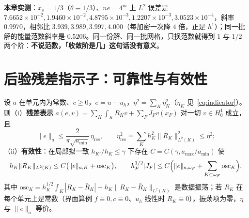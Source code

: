 \textbf{本章实测}：$x_s=1/3$（$\theta\equiv1/3$）、$ne=4^m$ 上 $L^2$ 误差是
$7.6652\times10^{-2},1.9460\times10^{-2},4.8795\times10^{-3},1.2207\times10^{-3},3.0523\times10^{-4}$，斜率
$0.9970$，相邻比 $3.939,3.989,3.997,4.000$（每加密一次降 $4$ 倍，正是 $h^1$）；同一批解的能量范数斜率是
$0.5206$。同一份解、同一批网格，只换范数就得到 $1$ 与 $1/2$ 两个阶：\textbf{不说范数，「收敛阶是几」这句话没有意义}。

\section{后验残差指示子：可靠性与有效性}

\begin{theorem}
\label{thm:indicator}
设 $a$ 在单元内为常数、$c\ge0$，$e=u-u_h$，$\eta^2=\sum_K\eta_K^2$（$\eta_K$
见~\eqref{eq:indicator}）。则（i）\textbf{残差表示} $a(e,v)=\sum_K\int_KR_Kv+\sum_FJ_Fv(x_F)$ 对一切 $v\in
H^1_0$ 成立，且
\begin{equation}
  \|e\|_a\le\frac{2}{\pi\sqrt{a_{\min}}}\,\eta_{\text{res}},\qquad
  \eta_{\text{res}}^2=\sum_Kh_K^2\|R_K\|_{L^2(K)}^2\le\eta^2 ;
  \label{eq:reliable}
\end{equation}
（ii）\textbf{有效性}：在局部拟一致 $h_{K'}/h_K\le\gamma$ 下存在 $C=C(\gamma,a_{\max}/a_{\min})$ 使
\begin{equation}
  h_K\|R_K\|_{L^2(K)}\le C\bigl(\|e\|_{a,K}+\mathrm{osc}_K\bigr),\qquad
  h_F^{1/2}|J_F|\le C\Bigl(\|e\|_{a,\omega_F}+\sum_{K\subset\omega_F}\mathrm{osc}_K\Bigr),
  \label{eq:efficient}
\end{equation}
其中 $\mathrm{osc}_K=h_K^{1/2}\!\int_K|R_K-\bar R_K|+h_K\|R_K-\bar R_K\|_{L^2(K)}$ 是数据振荡；若 $R_K$
在每个单元上是常数（界面算例 $f\equiv0,c\equiv0$、$u_h$ 线性时 $R_K\equiv0$），振荡项为零，$\eta$ 与 $\|e\|_a$ 等价。
\end{theorem}
